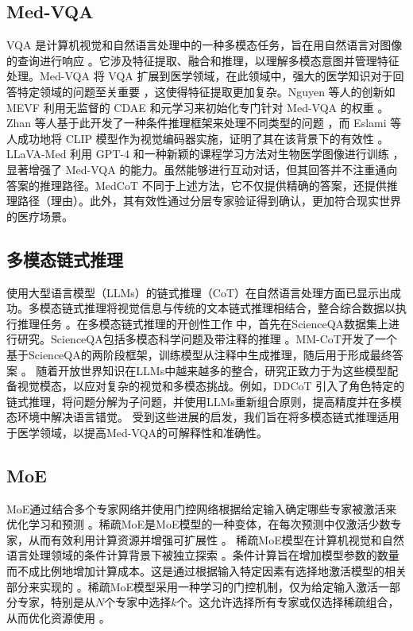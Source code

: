 \documentclass[11pt]{article}
\begin{document}
\subsection{Med-VQA}
VQA 是计算机视觉和自然语言处理中的一种多模态任务，旨在用自然语言对图像的查询进行响应 \cite{ben2019vqa,he2020pathvqa,ren2020cgmvqa}。它涉及特征提取、融合和推理，以理解多模态意图并管理特征处理。Med-VQA 将 VQA 扩展到医学领域，在此领域中，强大的医学知识对于回答特定领域的问题至关重要 \cite{liu2023parameter}，这使得特征提取更加复杂。Nguyen 等人的创新如 MEVF 利用无监督的 CDAE 和元学习来初始化专门针对 Med-VQA 的权重 \cite{nguyen2019overcoming}。Zhan 等人基于此开发了一种条件推理框架来处理不同类型的问题 \cite{zhan2020medical}，而 Eslami 等人成功地将 CLIP 模型作为视觉编码器实施，证明了其在该背景下的有效性 \cite{eslami-etal-2023-pubmedclip}。LLaVA-Med 利用 GPT-4 和一种新颖的课程学习方法对生物医学图像进行训练 \citet{li2024llava}，显著增强了 Med-VQA 的能力。虽然能够进行互动对话，但其回答并不注重通向答案的推理路径。MedCoT 不同于上述方法，它不仅提供精确的答案，还提供推理路径（理由）。此外，其有效性通过分层专家验证得到确认，更加符合现实世界的医疗场景。
\subsection{多模态链式推理}
使用大型语言模型（LLMs）的链式推理（CoT）在自然语言处理方面已显示出成功。多模态链式推理将视觉信息与传统的文本链式推理相结合，整合综合数据以执行推理任务 \cite{zhang2023multimodal,zheng2023ddcot}。在多模态链式推理的开创性工作 \cite{zheng2023ddcot,zhang2023multimodal,lu2022learn,lu2023chameleon,zhang2023llama} 中，首先在ScienceQA数据集上进行研究。ScienceQA包括多模态科学问题及带注释的推理 \cite{lu2022learn}。MM-CoT开发了一个基于ScienceQA的两阶段框架，训练模型从注释中生成推理，随后用于形成最终答案 \cite{lu2022learn}。 随着开放世界知识在LLMs中越来越多的整合，研究正致力于为这些模型配备视觉模态，以应对复杂的视觉和多模态挑战。例如，DDCoT \cite{zheng2023ddcot} 引入了角色特定的链式推理，将问题分解为子问题，并使用LLMs重新组合原则，提高精度并在多模态环境中解决语言错觉。 受到这些进展的启发，我们旨在将多模态链式推理适用于医学领域，以提高Med-VQA的可解释性和准确性。
\subsection{MoE}
MoE通过结合多个专家网络并使用门控网络根据给定输入确定哪些专家被激活来优化学习和预测 \cite{zhang2024scalable,fedus2022switch}。稀疏MoE是MoE模型的一种变体，在每次预测中仅激活少数专家，从而有效利用计算资源并增强可扩展性 \cite{shazeer2016outrageously}。
稀疏MoE模型在计算机视觉和自然语言处理领域的条件计算背景下被独立探索 \citet{jacobs1991adaptive,fedus2022review}。条件计算旨在增加模型参数的数量而不成比例地增加计算成本。这是通过根据输入特定因素有选择地激活模型的相关部分来实现的 \cite{shazeer2016outrageously}。稀疏MoE模型采用一种学习的门控机制，仅为给定输入激活一部分专家，特别是从\( N \)个专家中选择\( k \)个。这允许选择所有专家或仅选择稀疏组合，从而优化资源使用 \citet{lepikhin2020gshard}。
\end{document}
